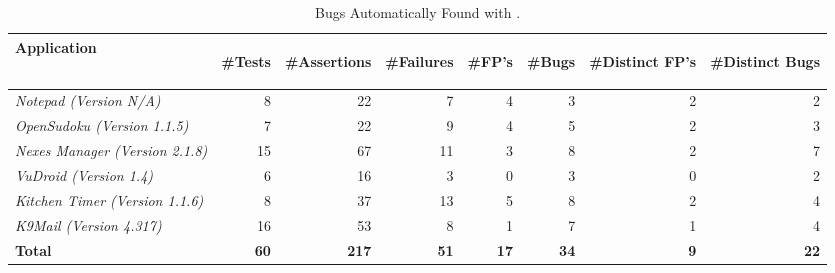 \begin{table}[t!]
\centering
\caption{Bugs Automatically Found with \tool.}
\label{table:bugsFound}
{
\begin{tabular}{lrrrrrrr}
\toprule
\bf{Application}&\begin{sideways}\bf{\#Tests}\end{sideways}&\begin{sideways}\bf{\#Assertions}\end{sideways}&\begin{sideways}\bf{\#Failures}\end{sideways}&\begin{sideways}\bf{\#FP's}\end{sideways}&\begin{sideways}\bf{\#Bugs}\end{sideways}&\begin{sideways}\bf{\#Distinct FP's}\end{sideways}&\begin{sideways}\bf{\#Distinct Bugs}\end{sideways}\\
\midrule
\textit{Notepad (Version N/A)}&8&22&7&4&3&2&2\\
\textit{OpenSudoku (Version 1.1.5)}&7&22&9&4&5&2&3\\
\textit{Nexes Manager (Version 2.1.8)}&15&67&11&3&8&2&7\\
\midrule
\textit{VuDroid (Version 1.4)}&6&16&3&0&3&0&2\\
\textit{Kitchen Timer (Version 1.1.6)}&8&37&13&5&8&2&4\\
\textit{K9Mail (Version 4.317)}&16&53&8&1&7&1&4\\
\midrule
\bf{Total}&\bf 60&\bf 217&\bf 51&\bf 17&\bf 34&\bf 9&\bf 22\\
\bottomrule
\end{tabular}
}
\end{table}
